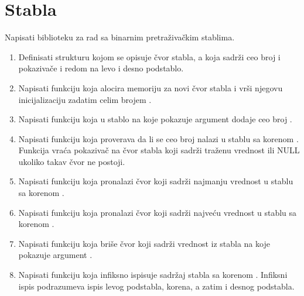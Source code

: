\section{Stabla}

\begin{Exercise}[label=701]
Napisati biblioteku za rad sa binarnim pretraživačkim stablima.

\begin{enumerate}
\item Definisati strukturu  kojom se opisuje čvor stabla, a koja sadrži ceo broj  i pokazivače  i  redom na levo i desno podstablo.

\item Napisati funkciju  koja alocira memoriju za novi čvor stabla i vrši njegovu inicijalizaciju zadatim celim brojem .

\item Napisati funkciju  koja u stablo na koje pokazuje argument  dodaje ceo broj .

\item Napisati funkciju  koja proverava da li se ceo broj  nalazi u stablu sa korenom . Funkcija vraća pokazivač na čvor stabla koji sadrži traženu vrednost ili NULL ukoliko takav čvor ne postoji.

\item Napisati funkciju  koja pronalazi čvor koji sadrži najmanju vrednost u stablu sa korenom . 

\item Napisati funkciju  koja pronalazi čvor koji sadrži najveću vrednost u stablu sa korenom .

\item Napisati funkciju  koja briše čvor koji sadrži vrednost  iz stabla na koje pokazuje argument .

\item Napisati funkciju  koja infiksno ispisuje sadržaj stabla sa korenom . Infiksni ispis podrazumeva ispis levog podstabla, korena, a zatim i desnog podstabla.


\end{enumerate}
\end{Exercise}
